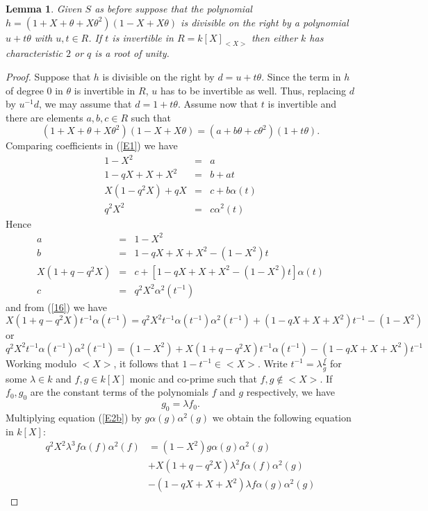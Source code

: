 \documentclass[a4paper, 11pt]{article}
\newtheorem{lemma}[theorem]{Lemma}
\theoremstyle{definition}
\begin{document}
\begin{lemma}\label{L2} Given $S$ as before suppose that the  polynomial  $h=(1+X+\theta+X\theta^2)(1-X+X\theta)$  is   divisible on the right by a polynomial $u+t\theta$ with $u,t\in R$. If $t$ is invertible in $R=k[X]_{<X>}$ then either $k$ has characteristic $2$ or $q$ is a root of unity.
\end{lemma}
\begin{proof}
 Suppose that $h$ is divisible on the right by $d=u+t\theta$. Since the term in $h$ of degree $0$ in $\theta$ is invertible in $R$, $u$ has to be invertible as well. Thus, replacing $d$ by $u^{-1}d$, we may assume that $d=1+t\theta$. Assume now that $t$ is invertible and there are elements  $a,b,c\in R$ such that
\begin{equation}\label{E1}
(1+X+\theta+X\theta^2)(1-X+X\theta)=(a+b\theta+c\theta^2)(1+t\theta).
\end{equation}
Comparing  coefficients in (\ref{E1}) we have
\begin{eqnarray}
1-X^2&=&a\\
1-qX+X+X^2&=&b+at\\
X(1-q^2X)+qX&=&c+b\alpha(t)\\
q^2X^2&=&c\alpha^2(t)
\end{eqnarray}
Hence
\begin{eqnarray}
a&=&1-X^2\\
b&=&1-qX+X+X^2-(1-X^2)t\\
X(1+q-q^2X)&=&c+[1-qX+X+X^2-(1-X^2)t]\alpha(t)\label{16}\\
c&=&q^2X^2\alpha^2(t^{-1})
\end{eqnarray}
and from (\ref{16}) we have
\begin{equation}\label{E2}
X(1+q-q^2X)t^{-1}\alpha(t^{-1})=q^2X^2t^{-1}\alpha(t^{-1})\alpha^2(t^{-1})+(1-qX+X+X^2)t^{-1}-(1-X^2)
\end{equation}
or
\begin{equation}\label{E2b}
q^2X^2t^{-1}\alpha(t^{-1})\alpha^2(t^{-1})= (1-X^2)+ X(1+q-q^2X)t^{-1}\alpha(t^{-1})-(1-qX+X+X^2)t^{-1}
\end{equation}
Working modulo $<X>$, it follows that $1-t^{-1}\in <X>$. Write $t^{-1}=\lambda\frac{f}{g}$ for some $\lambda \in k$ and $f,g\in k[X]$ monic and co-prime such that $f,g\notin <X>$. If $f_0, g_0$ are the constant terms of the polynomials $f$ and $g$ respectively, we have
\begin{equation}\label{zero_degree}
g_0=\lambda f_0.
\end{equation}
Multiplying equation (\ref{E2b}) by $g\alpha(g)\alpha^2(g)$ we obtain the following equation in $k[X]$:
\begin{equation}\label{E2c}
\begin{split}
q^2X^2\lambda^3f\alpha(f)\alpha^2(f)&= (1-X^2)g\alpha(g)\alpha^2(g)\\
&+ X(1+q-q^2X)\lambda^2f\alpha(f)\alpha^2(g)\\
&-(1-qX+X+X^2)\lambda f\alpha(g)\alpha^2(g)
\end{split}
\end{equation}


\end{proof}
\end{document}
